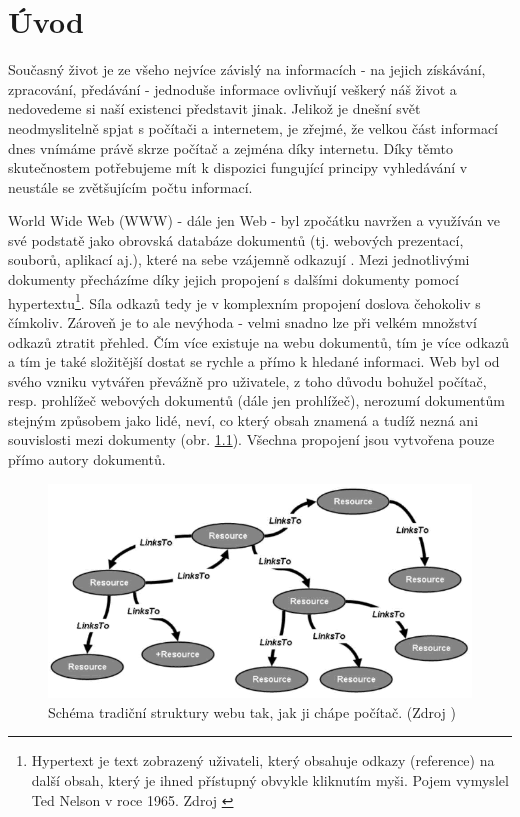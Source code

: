 \chapter{Úvod}
Současný život je ze všeho nejvíce závislý na informacích - na jejich získávání, zpracování, předávání - jednoduše informace ovlivňují veškerý náš život 
a nedovedeme si naší existenci představit jinak. 
Jelikož je dnešní svět neodmyslitelně spjat s počítači a internetem, je zřejmé, že velkou část informací dnes vnímáme právě skrze počítač a zejména díky internetu.
Díky těmto skutečnostem potřebujeme mít k dispozici fungující principy vyhledávání v neustále se zvětšujícím počtu informací.

World Wide Web (WWW) - dále jen Web - byl zpočátku navržen a využíván ve své podstatě jako obrovská databáze dokumentů (tj. webových prezentací, souborů, aplikací aj.), které na sebe vzájemně odkazují \cite{www}. 
Mezi jednotlivými dokumenty přecházíme díky jejich propojení s dalšími dokumenty pomocí hypertextu\footnote{Hypertext je text zobrazený uživateli, který obsahuje odkazy (reference) na další obsah, který je ihned přístupný obvykle kliknutím myši. Pojem vymyslel Ted Nelson v roce 1965. Zdroj \cite{hypertext}}. 
Síla odkazů tedy je v komplexním propojení doslova čehokoliv s čímkoliv. Zároveň je to ale nevýhoda - velmi snadno lze při velkém množství odkazů ztratit přehled. Čím více existuje na webu dokumentů, tím je více odkazů a tím je také složitější dostat se rychle a přímo k hledané informaci.
Web byl od svého vzniku vytvářen převážně pro uživatele, z toho důvodu bohužel počítač, resp. prohlížeč webových dokumentů (dále jen prohlížeč), nerozumí dokumentům stejným způsobem jako lidé, neví, co který obsah znamená a tudíž nezná ani souvislosti mezi dokumenty (obr. \ref{img:hyperlinks}). 
Všechna propojení jsou vytvořena pouze přímo autory dokumentů.

\begin{figure}[h]
\begin{center}
\includegraphics[width=12cm]{figures/hyperlinks}
\caption{Schéma tradiční struktury webu tak, jak ji chápe počítač. (Zdroj \cite{holyj_webexpo})}
\label{img:hyperlinks}
\end{center}
\end{figure}

